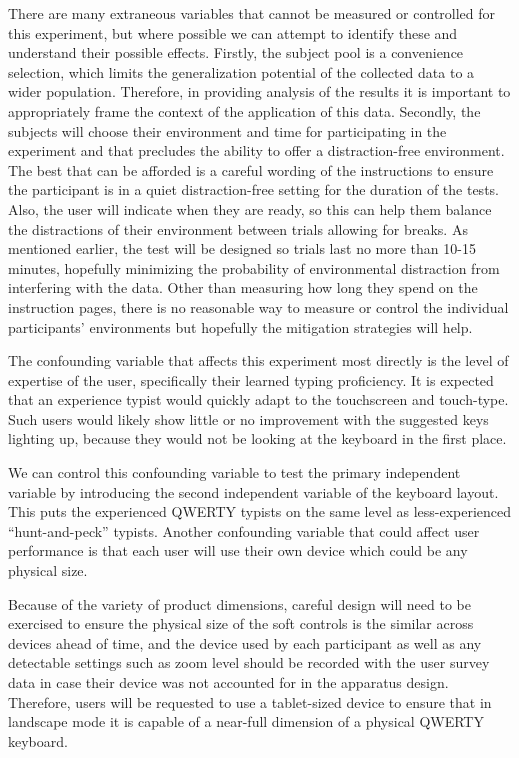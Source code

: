\documentclass[english]{vgtc}
\begin{document}
There are many extraneous variables that cannot be measured or controlled
for this experiment, but where possible we can attempt to identify
these and understand their possible effects. Firstly, the subject
pool is a convenience selection, which limits the generalization potential
of the collected data to a wider population. Therefore, in providing
analysis of the results it is important to appropriately frame the
context of the application of this data. Secondly, the subjects will
choose their environment and time for participating in the experiment
and that precludes the ability to offer a distraction-free environment.
The best that can be afforded is a careful wording of the instructions
to ensure the participant is in a quiet distraction-free setting for
the duration of the tests. Also, the user will indicate when they are
ready, so this can help them balance the distractions of their environment 
between trials allowing for breaks. As mentioned earlier,
the test will be designed so trials last no more than 10-15 minutes, hopefully
minimizing the probability of environmental distraction from interfering with
the data. Other than measuring how long they spend on the instruction
pages, there is no reasonable way to measure or control the individual
participants\textquoteright{} environments but hopefully the mitigation
strategies will help.

The confounding variable that affects this experiment
most directly is the level of expertise of the user, specifically
their learned typing proficiency. It is expected that an experience
typist would quickly adapt to the touchscreen and touch-type. Such
users would likely show little or no improvement with the suggested
keys lighting up, because they would not be looking at the keyboard
in the first place. 

We can control this confounding variable to test
the primary independent variable by introducing the second independent
variable of the keyboard layout. This puts the experienced QWERTY
typists on the same level as less-experienced \textquotedblleft hunt-and-peck\textquotedblright{}
typists. Another confounding variable that could affect user performance
is that each user will use their own device which could be any physical
size.

Because of the variety of product dimensions, careful design
will need to be exercised to ensure the physical size of the soft
controls is the similar across devices ahead of time, and the device
used by each participant as well as any detectable settings such as
zoom level should be recorded with the user survey data in case their
device was not accounted for in the apparatus design. Therefore, users will be
requested to use a tablet-sized device to ensure that in landscape
mode it is capable of a near-full dimension of a physical QWERTY keyboard. 
\end{document}
